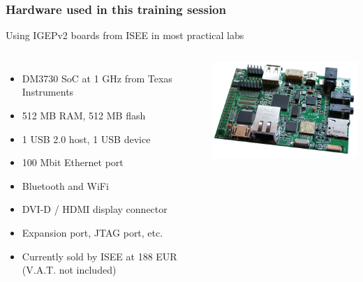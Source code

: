 \begin{frame}
\frametitle{Hardware used in this training session}
  Using IGEPv2 boards from ISEE in most practical labs
  \begin{columns}
    \begin{itemize}
      \item DM3730 SoC at 1 GHz from Texas Instruments
      \item 512 MB RAM, 512 MB flash
      \item 1 USB 2.0 host, 1 USB device
      \item 100 Mbit Ethernet port
      \item Bluetooth and WiFi
      \item DVI-D / HDMI display connector
      \item Expansion port, JTAG port, etc.
      \item Currently sold by ISEE at 188 EUR (V.A.T. not included)
    \end{itemize}
    \includegraphics[width=\textwidth]{slides/igepv2-board/igepv2-board.png}
  \end{columns}
\end{frame}
